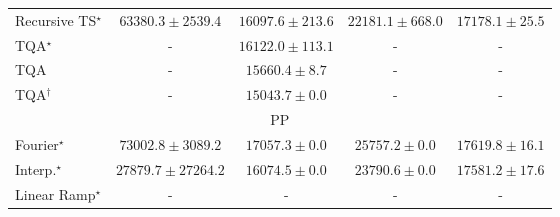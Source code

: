 \begin{tabular}{l|cccc|}
Recursive TS$^\star$ & {\cellcolor[HTML]{943304}} \color[HTML]{F1F1F1} $63380.3\pm 2539.4$ & {\cellcolor[HTML]{FED16B}} \color[HTML]{000000} $16097.6\pm 213.6$ & {\cellcolor[HTML]{FEBD49}} \color[HTML]{000000} $22181.1\pm 668.0$ & {\cellcolor[HTML]{FECD63}} \color[HTML]{000000} $17178.1\pm 25.5$ \\
TQA$^\star$ & {\cellcolor[HTML]{000000}} \color[HTML]{F1F1F1} {\cellcolor{white}} \color{black} - & {\cellcolor[HTML]{FED16B}} \color[HTML]{000000} $16122.0\pm 113.1$ & {\cellcolor[HTML]{000000}} \color[HTML]{F1F1F1} {\cellcolor{white}} \color{black} - & {\cellcolor[HTML]{000000}} \color[HTML]{F1F1F1} {\cellcolor{white}} \color{black} - \\
TQA & {\cellcolor[HTML]{000000}} \color[HTML]{F1F1F1} {\cellcolor{white}} \color{black} - & {\cellcolor[HTML]{FED26D}} \color[HTML]{000000} $15660.4\pm 8.7$ & {\cellcolor[HTML]{000000}} \color[HTML]{F1F1F1} {\cellcolor{white}} \color{black} - & {\cellcolor[HTML]{000000}} \color[HTML]{F1F1F1} {\cellcolor{white}} \color{black} - \\
TQA$^\dagger$ & {\cellcolor[HTML]{000000}} \color[HTML]{F1F1F1} {\cellcolor{white}} \color{black} - & {\cellcolor[HTML]{FED471}} \color[HTML]{000000} $15043.7\pm 0.0$ & {\cellcolor[HTML]{000000}} \color[HTML]{F1F1F1} {\cellcolor{white}} \color{black} - & {\cellcolor[HTML]{000000}} \color[HTML]{F1F1F1} {\cellcolor{white}} \color{black} - \\
\cline{1-5}
\multicolumn{5}{c}{\rule{0pt}{8pt}PP} \\
\midrule
Fourier$^\star$ & {\cellcolor[HTML]{004529}} \color[HTML]{F1F1F1} $73002.8\pm 3089.2$ & {\cellcolor[HTML]{BCE395}} \color[HTML]{000000} $17057.3\pm 0.0$ & {\cellcolor[HTML]{92D183}} \color[HTML]{000000} $25757.2\pm 0.0$ & {\cellcolor[HTML]{B9E294}} \color[HTML]{000000} $17619.8\pm 16.1$ \\
Interp.$^\star$ & {\cellcolor[HTML]{88CD7F}} \color[HTML]{000000} $27879.7\pm 27264.2$ & {\cellcolor[HTML]{C0E597}} \color[HTML]{000000} $16074.5\pm 0.0$ & {\cellcolor[HTML]{9CD687}} \color[HTML]{000000} $23790.6\pm 0.0$ & {\cellcolor[HTML]{B9E294}} \color[HTML]{000000} $17581.2\pm 17.6$ \\
Linear Ramp$^\star$ & {\cellcolor[HTML]{000000}} \color[HTML]{F1F1F1} {\cellcolor{white}} \color{black} - & {\cellcolor[HTML]{000000}} \color[HTML]{F1F1F1} {\cellcolor{white}} \color{black} - & {\cellcolor[HTML]{000000}} \color[HTML]{F1F1F1} {\cellcolor{white}} \color{black} - & {\cellcolor[HTML]{000000}} \color[HTML]{F1F1F1} {\cellcolor{white}} \color{black} - \\

\end{tabular}
